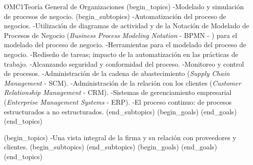 \begin{BKL2}{OMC1}{Teoría General de Organizaciones}
(begin_topics)
-Modelado y simulación de procesos de negocio.
(begin_subtopics)
-Automatización del proceso de negocios.
-Utilización de diagramas de actividad y de la Notación de Modelado de Procesos de Negocio (\emph{Business Process Modeling Notation} - BPMN - ) para el modelado del proceso de negocio.
-Herramientas para el modelado del proceso de negocio.
-Rediseño de tareas; impacto de la automatización en las prácticas de trabajo.
-Alcanzando seguridad y conformidad del proceso.
-Monitoreo y control de procesos.
-Administración de la cadena de abastecimiento (\emph{Supply Chain Management} - SCM). 
-Administración de la relación con los clientes (\emph{Customer Relationship Management} - CRM).
-Sistemas de gerenciamiento empresarial (\emph{Enterprise Management Systems} - ERP).
-El proceso continuo: de procesos estructurados a no estructurados.
(end_subtopics)
(begin_goals)
(end_goals)
(end_topics)

(begin_topics)
-Una vista integral de la firma y su relación con proveedores y clientes.
(begin_subtopics)
(end_subtopics)
(begin_goals)
(end_goals)
(end_topics)

\end{BKL2}




